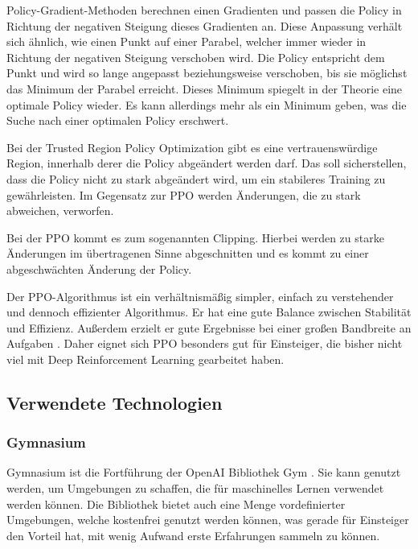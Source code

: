 Policy-Gradient-Methoden berechnen einen Gradienten und passen die Policy in Richtung der negativen Steigung dieses Gradienten an. Diese Anpassung verhält sich ähnlich, wie einen Punkt auf einer Parabel, welcher immer wieder in Richtung der negativen Steigung verschoben wird. Die Policy entspricht dem Punkt und wird so lange angepasst beziehungsweise verschoben, bis sie möglichst das Minimum der Parabel erreicht. Dieses Minimum spiegelt in der Theorie eine optimale Policy wieder. Es kann allerdings mehr als ein Minimum geben, was die Suche nach einer optimalen Policy erschwert.

Bei der Trusted Region Policy Optimization gibt es eine vertrauenswürdige Region, innerhalb derer die Policy abgeändert werden darf. Das soll sicherstellen, dass die Policy nicht zu stark abgeändert wird, um ein stabileres Training zu gewährleisten. Im Gegensatz zur PPO werden Änderungen, die zu stark abweichen, verworfen.

Bei der PPO kommt es zum sogenannten Clipping. Hierbei werden zu starke Änderungen im übertragenen Sinne abgeschnitten und es kommt zu einer abgeschwächten Änderung der Policy.

Der PPO-Algorithmus ist ein verhältnismäßig simpler, einfach zu verstehender und dennoch effizienter Algorithmus. Er hat eine gute Balance zwischen Stabilität und Effizienz. Außerdem erzielt er gute Ergebnisse bei einer großen Bandbreite an Aufgaben \cite{schulman_proximal_2017}. Daher eignet sich PPO besonders gut für Einsteiger, die bisher nicht viel mit Deep Reinforcement Learning gearbeitet haben.

\newpage
\subsection{Verwendete Technologien}
\subsubsection{Gymnasium}
Gymnasium ist die Fortführung der OpenAI Bibliothek Gym \cite{towers_gymnasium_2023}. Sie kann genutzt werden, um Umgebungen zu schaffen, die für maschinelles Lernen verwendet werden können. Die Bibliothek bietet auch eine Menge vordefinierter Umgebungen, welche kostenfrei genutzt werden können, was gerade für Einsteiger den Vorteil hat, mit wenig Aufwand erste Erfahrungen sammeln zu können.

